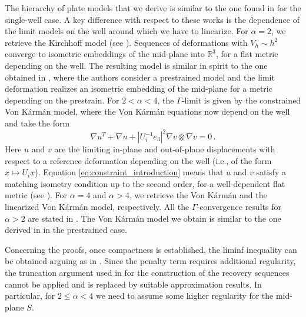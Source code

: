 \documentclass{article}
\theoremstyle{plain}
\theoremstyle{plain}
\theoremstyle{plain}
\theoremstyle{plain}
\theoremstyle{plain}
\theoremstyle{definition}
\theoremstyle{definition}
\renewcommand{\r}{\mathbb{R}}
\begin{document}
The hierarchy of plate models that we derive is similar to the one found in \cite{FRIESECKE2002,FRIESECKE2006} for the single-well case. A key difference with respect to these works is the dependence of the limit models on the well around which we have to linearize. For $\alpha = 2$, we retrieve the Kirchhoff model (see ). Sequences of deformations with $V_h \sim h^2$ converge to isometric embeddings of the mid-plane into $\r^3$, for a flat metric depending on the well. The resulting model is similar in spirit to the one obtained in \cite{BHATTACHARYA2016}, where the authors consider a prestrained model and the limit deformation realizes an isometric embedding of the mid-plane for a metric depending on the prestrain. For $2 < \alpha < 4$, the $\Gamma$-limit is given by the constrained Von K\'arm\'an model, where the Von K\'arm\'an equations now depend on the well and take the form
\begin{equation}
	\nabla u^T + \nabla u + |U^{-1}_i e_3|^2 \nabla v \otimes \nabla v = 0 \,. \label{eq:constraint_introduction}
\end{equation}
Here $u$ and $v$ are the limiting in-plane and out-of-plane displacements with respect to a reference deformation depending on the well (i.e., of the form $x \mapsto U_i x$). Equation \eqref{eq:constraint_introduction} means that $u$ and $v$ satisfy a matching isometry condition up to the second order, for a well-dependent flat metric (see ). For $\alpha = 4$ and $\alpha > 4$, we retrieve the Von K\'arm\'an and the linearized Von K\'arm\'an model, respectively. All the $\Gamma$-convergence results for $\alpha > 2$ are stated in . The Von K\'arm\'an model we obtain is similar to the one derived in \cite{RICCIOTTI2017} in the prestrained case. 

Concerning the proofs, once compactness is established, the liminf inequality can be obtained arguing as in \cite{FRIESECKE2002, FRIESECKE2006}. Since the penalty term requires additional regularity, the truncation argument used in \cite{FRIESECKE2002, FRIESECKE2006} for the construction of the recovery sequences cannot be applied and is replaced by suitable approximation results. In particular, for $ 2 \leq \alpha < 4 $ we need to assume some higher regularity for the mid-plane $ S $. 
\end{document}
